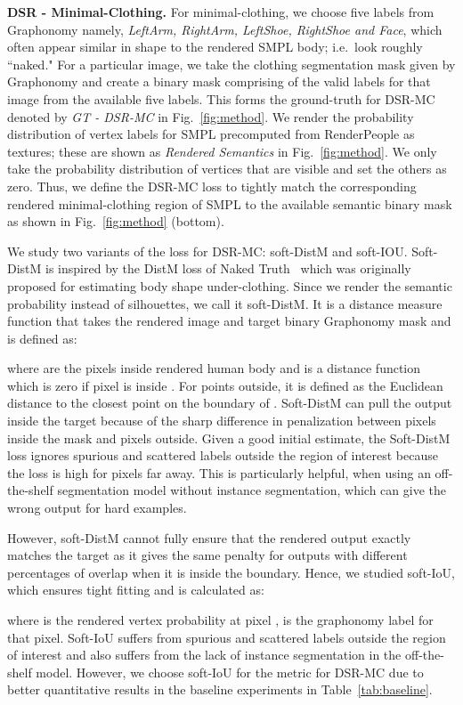 \documentclass[10pt,twocolumn,letterpaper]{article}
\newcommand{\modelname}[0]{DSR\xspace}
\begin{document}
\textbf{DSR - Minimal-Clothing.} For minimal-clothing, we choose five labels from Graphonomy namely, \emph{LeftArm, RightArm, LeftShoe, RightShoe and Face}, which often appear similar in shape to the rendered SMPL body; i.e.~look roughly ``naked."
For a particular image, we take the clothing segmentation mask given by Graphonomy and create a binary mask  comprising of the valid labels for that image from the available five labels. This forms the ground-truth for \modelname-MC denoted by \emph{GT - DSR-MC} in Fig.~\ref{fig:method}. We render the probability distribution of vertex labels for SMPL precomputed from RenderPeople as textures; these are shown as \textit{Rendered Semantics} in Fig.~\ref{fig:method}. We only take the probability distribution of vertices that are visible and set the others as zero. Thus, we define the \modelname-MC loss to tightly match the corresponding rendered minimal-clothing region of SMPL to the available semantic binary mask as shown in Fig.~\ref{fig:method} (bottom).

We study two variants of the loss for \modelname-MC: soft-DistM and soft-IOU. Soft-DistM is inspired by the DistM loss of Naked Truth~\cite{balan_eccv} which was originally proposed for estimating body shape under-clothing. Since we render the semantic probability instead of silhouettes, we call it soft-DistM. It is a distance measure function that takes the rendered image  and target binary Graphonomy mask  and is defined as: 

where  are the pixels inside rendered human body and  is a distance function which is zero if pixel  is inside . For points outside, it is defined as the Euclidean distance to the closest point on the boundary of . Soft-DistM can pull the output inside the target because of the sharp difference in penalization between pixels inside the mask and pixels outside. Given a good initial estimate, the Soft-DistM loss ignores spurious and scattered labels outside the region of interest because the loss is high for pixels far away. This is particularly helpful, when using an off-the-shelf segmentation model without instance segmentation, which can give the wrong output for hard examples.

However, soft-DistM cannot fully ensure that the rendered output exactly matches the target as it gives the same penalty for outputs with different percentages of overlap when it is inside the boundary. Hence, we studied soft-IoU, which ensures tight fitting and is calculated as:

where  is the rendered vertex probability at pixel ,  is the graphonomy label for that pixel. Soft-IoU suffers from spurious and scattered labels outside the region of interest and also suffers from the lack of instance segmentation in the off-the-shelf model. However, we choose soft-IoU for the metric for \modelname-MC due to better quantitative results in the baseline experiments in Table~\ref{tab:baseline}. 
\end{document}
